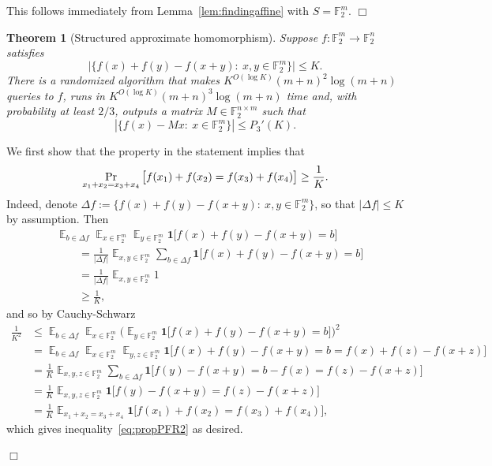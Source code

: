 \documentclass[11pt]{amsart}
\renewcommand{\Pr}{\mathop{\mbox{\rm Pr}}}
\newcommand{\Exp}{\mathop{\mathbb{E}}}
\newcommand{\F}{\mathbb{F}} %
\newcommand{\one}{\mathbf{1}}
\theoremstyle{plain}
\newtheorem{theorem}{Theorem}[section]
\theoremstyle{definition}
\theoremstyle{remark}
\renewenvironment{proof}[1][]{
    	\begin{trivlist}
     	\item[\hspace{\labelsep}{\em\noindent Proof#1:\/}]}
     	{{\hfill$\Box$}
    	\end{trivlist}
  }
\begin{document}
\begin{proof}
This follows immediately from Lemma~\ref{lem:findingaffine} with $S = \F_2^m$.
\end{proof}

\begin{theorem}[Structured approximate homomorphism]
\label{thm:algoPFR3'}
    Suppose $f: \F_2^m \to \F_2^n$ satisfies
    $$\big|\big\{f(x)+f(y)-f(x+y):\: x, y\in \F_2^m \big\}\big| \leq K.$$
    There is a randomized algorithm that makes $K^{O(\log K)} (m+n)^2 \log (m+n)$ queries to $f$, runs in $K^{O(\log K)} (m+n)^3 \log (m+n)$ time and, with probability at least $2/3$, outputs a matrix $M \in \F_2^{n\times m}$ such that
    $$|\{f(x) - Mx:\: x\in \F_2^m\}| \leq P_3'(K).$$
\end{theorem}

\begin{proof}
We first show that the property in the statement implies that
\begin{equation} \label{eq:propPFR2}
    \Pr_{x_1+x_2 = x_3+x_4} \big[f(x_1)+f(x_2) = f(x_3)+f(x_4)\big] \geq \frac{1}{K}.
\end{equation}
Indeed, denote $\Delta f := \big\{f(x)+f(y)-f(x+y):\: x, y\in \F_2^m \big\}$, so that $|\Delta f| \leq K$ by assumption.
Then
\begin{align*}
    &\Exp_{b\in \Delta f} \Exp_{x\in \F_2^m} \Exp_{y\in \F_2^m} \one \big[f(x)+f(y)-f(x+y) = b\big] \\
    &\qquad = \frac{1}{|\Delta f|} \Exp_{x, y\in \F_2^m} \sum_{b\in \Delta f} \one \big[f(x)+f(y)-f(x+y) = b\big] \\
    &\qquad = \frac{1}{|\Delta f|} \Exp_{x, y\in \F_2^m} 1 \\
    &\qquad \geq \frac{1}{K},
\end{align*}
and so by Cauchy-Schwarz
\begin{align*}
    \frac{1}{K^2}
    &\leq \Exp_{b\in \Delta f} \Exp_{x\in \F_2^m} \Big(\Exp_{y\in \F_2^m} \one \big[f(x)+f(y)-f(x+y) = b\big]\Big)^2 \\
    &= \Exp_{b\in \Delta f} \Exp_{x\in \F_2^m} \Exp_{y, z\in \F_2^m} \one \big[f(x)+f(y)-f(x+y) = b = f(x)+f(z)-f(x+z)\big] \\
    &= \frac{1}{K} \Exp_{x, y, z\in \F_2^m} \sum_{b\in \Delta f} \one \big[f(y)-f(x+y) = b-f(x) = f(z)-f(x+z)\big] \\
    &= \frac{1}{K} \Exp_{x, y, z\in \F_2^m} \one \big[f(y)-f(x+y) = f(z)-f(x+z)\big] \\
    &= \frac{1}{K} \Exp_{x_1+x_2 = x_3+x_4} \one \big[f(x_1)+f(x_2) = f(x_3)+f(x_4)\big],
\end{align*}
which gives inequality~\eqref{eq:propPFR2} as desired.


\end{proof}
\end{document}
